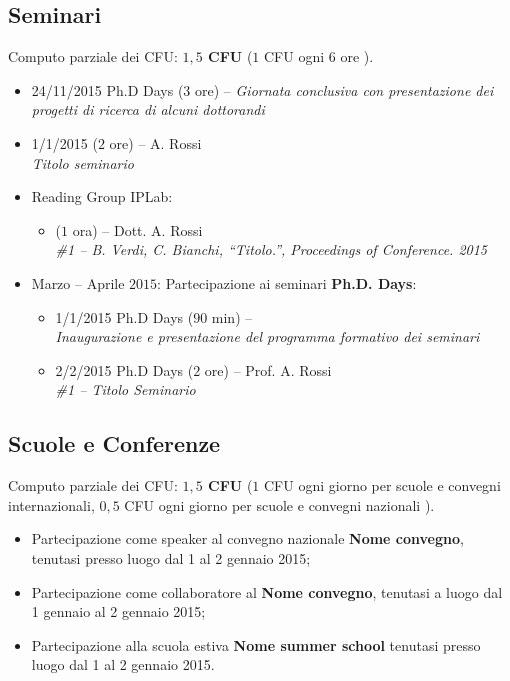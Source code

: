 \documentclass[a4paper,12pt]{article}
\begin{document}
\subsection{Seminari}
Computo parziale dei CFU: \textbf{$1,5$ CFU} ($1$ CFU ogni $6$ ore \cite{regolamento}).
\begin{itemize}
    \item 24/11/2015 Ph.D Days ($3$ ore) -- \textit{Giornata conclusiva con presentazione dei progetti di ricerca di alcuni dottorandi}
    \item 1/1/2015 ($2$ ore) -- A. Rossi\\\textit{Titolo seminario}

    \item Reading Group IPLab:
        \begin{itemize}
            \item ($1$ ora) -- Dott. A. Rossi\\\textit{\#1 -- B. Verdi, C. Bianchi, ``Titolo.'', Proceedings of Conference. 2015}
        \end{itemize}

	\item Marzo -- Aprile $2015$: Partecipazione ai seminari \textbf{Ph.D. Days}:
		\begin{itemize}
			\item 1/1/2015 Ph.D Days ($90$ min) -- \\\textit{Inaugurazione e presentazione del programma formativo dei seminari}			
			\item 2/2/2015 Ph.D Days ($2$ ore) -- Prof. A. Rossi\\\textit{\#1 -- Titolo Seminario}
		\end{itemize}
\end{itemize}


\subsection{Scuole e Conferenze}
Computo parziale dei CFU: \textbf{$1,5$ CFU} ($1$ CFU ogni giorno per scuole e convegni internazionali, $0,5$ CFU ogni giorno per scuole e convegni nazionali \cite{regolamento}).
\begin{itemize}
    \item Partecipazione come speaker al convegno nazionale \textbf{Nome convegno}, tenutasi presso luogo dal 1 al 2 gennaio 2015;
    \item Partecipazione come collaboratore al \textbf{Nome convegno}, tenutasi a luogo dal 1 gennaio al 2 gennaio 2015;
    \item Partecipazione alla scuola estiva \textbf{Nome summer school} tenutasi presso luogo dal 1 al 2 gennaio 2015.
\end{itemize}
\end{document}
